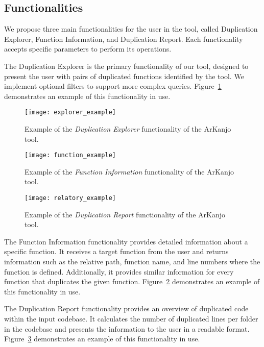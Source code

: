 \documentclass[conference]{IEEEtran}
\begin{document}
\subsection{Functionalities}

We propose three main functionalities for the user in the tool, called Duplication
Explorer, Function Information, and Duplication Report. Each functionality accepts
specific parameters to perform its operations.

The Duplication Explorer is the primary functionality of our tool, designed to present
the user with pairs of duplicated functions identified by the tool. We implement optional
filters to support more complex queries. Figure~\ref{fig:explorer_ex} demonstrates an
example of this functionality in use.

\begin{figure}[!t]
\centering
\texttt{[image: explorer\_example]}
\caption{Example of the \textit{Duplication Explorer} functionality of the ArKanjo tool.}
\label{fig:explorer_ex}
\end{figure}

\begin{figure}[!t]
\centering
\texttt{[image: function\_example]}
\caption{Example of the \textit{Function Information} functionality of the ArKanjo tool.}
\label{fig:function_ex}
\end{figure}

\begin{figure}[!t]
\centering
\texttt{[image: relatory\_example]}
\caption{Example of the \textit{Duplication Report} functionality of the ArKanjo tool.}
\label{fig:relatory_ex}
\end{figure}

The Function Information functionality provides detailed information about a specific function. 
It receives a target function from the user
and returns information such as the relative path, function name, and line numbers where
the function is defined. Additionally, it provides similar information for every function
that duplicates the given function. Figure~\ref{fig:function_ex} demonstrates an
example of this functionality in use.

The Duplication Report functionality provides an overview of
duplicated code within the input codebase. It calculates the number of
duplicated lines per folder in the codebase and presents the information to the user in
a readable format. Figure~\ref{fig:relatory_ex} demonstrates an example of this functionality in use.
\end{document}
